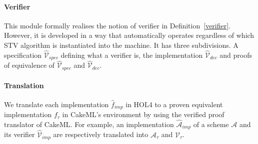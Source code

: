 \documentclass[10pt,conference]{IEEEtran}
\begin{document}
\paragraph*{\textbf{Verifier}} This module formally realises  the notion of verifier in Definition~\ref{verifier}. However, it is developed in a way that automatically operates  regardless of which STV algorithm is instantiated into the machine. It has three subdivisions. A  specification $\hat{\mathcal{V}}_{spec}$ defining what a verifier is, the implementation $\hat{\mathcal{V}}_{dec}$ and proofs of equivalence of $\hat{\mathcal{V}}_{spec}$ and $\hat{\mathcal{V}}_{dec}$.
\paragraph*{\textbf{Translation}} We translate each implementation $\hat{f}_{imp}$ in HOL4 to a proven  equivalent implementation $f_{\tau}$ in CakeML's environment by using the verified proof translator of CakeML. For example, an implementation  $\hat{\mathcal{A}}_{imp}$ of a scheme $\mathcal{A}$ and its   verifier $\hat{\mathcal{V}}_{imp}$ are  respectively translated into $\mathcal{A}_{\tau}$  and $\mathcal{V}_{\tau}$. 
\end{document}
